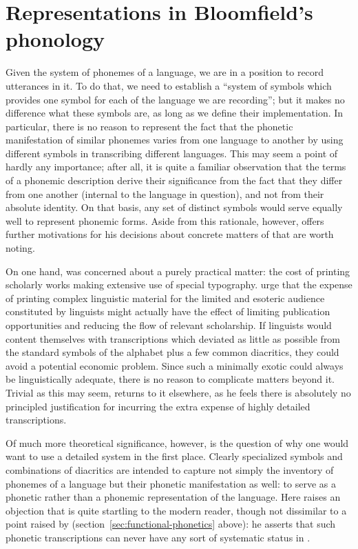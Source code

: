 \section{Representations in Bloomfield's phonology}
\label{sec:bloomfield-representations}

Given the system of phonemes of a language, we are in a position to
record utterances in it. To do that, we need to establish a ``system of
symbols which provides one symbol for each  of the language we
are recording''; but it makes no difference what these symbols are, as
long as we define their implementation. In particular, there is no
reason to represent the fact that the phonetic manifestation of
similar phonemes varies from one language to another by using
different symbols in transcribing different languages. This may seem a
point of hardly any importance; after all, it is quite a familiar
observation that the terms of a phonemic description derive their
significance from the fact that they differ from one another (internal
to the language in question), and not from their absolute identity. On
that basis, any set of distinct symbols would serve equally well to
represent phonemic forms. Aside from this rationale, however,
{\Bloomfield} offers further motivations for his decisions about concrete
matters of  that are worth noting.

On one hand, {\Bloomfield} was concerned about a purely practical matter:
the cost of printing scholarly works making extensive use of special
typography. \citet{bloomfield.bolling27:transcription} urge that the
expense of printing complex linguistic material for the limited and
esoteric audience constituted by linguists might actually have the
effect of limiting publication opportunities and reducing the flow of
relevant scholarship. If linguists would content themselves with
transcriptions which deviated as little as possible from the standard
symbols of the alphabet plus a few common diacritics, they could avoid
a potential economic problem. Since such a minimally exotic
 could always be linguistically adequate, there is no
reason to complicate matters beyond it. Trivial as this may seem,
{\Bloomfield} returns to it elsewhere, as he feels there is absolutely no
principled justification for incurring the extra expense of highly
detailed transcriptions.

Of much more theoretical significance, however, is the question of why
one would want to use a detailed  system in the first
place. Clearly specialized symbols and combinations of diacritics are
intended to capture not simply the inventory of phonemes of a language
but their phonetic manifestation as well: to serve as a phonetic
rather than a phonemic representation of the language. Here {\Bloomfield}
raises an objection that is quite startling to the modern reader, 
though not dissimilar to a point raised by {\Martinet} 
(section~\ref{sec:functional-phonetics} above): he
asserts that such phonetic transcriptions can never have any sort of
systematic status in .

